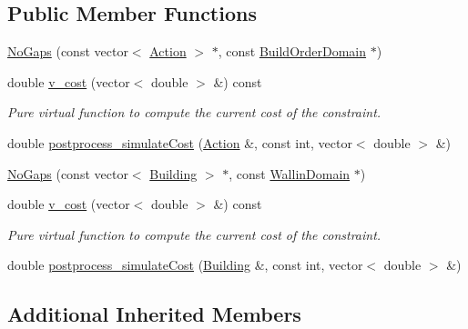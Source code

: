 \subsection*{Public Member Functions}
\begin{DoxyCompactItemize}
\item 
\hyperlink{classghost_1_1NoGaps_a7c3840344616681499ee350de3a33819}{No\-Gaps} (const vector$<$ \hyperlink{classghost_1_1Action}{Action} $>$ $\ast$, const \hyperlink{classghost_1_1BuildOrderDomain}{Build\-Order\-Domain} $\ast$)
\item 
double \hyperlink{classghost_1_1NoGaps_a3fa23de6946e443f009ecb5054a96572}{v\-\_\-cost} (vector$<$ double $>$ \&) const 
\begin{DoxyCompactList}\small\item\em Pure virtual function to compute the current cost of the constraint. \end{DoxyCompactList}\item 
double \hyperlink{classghost_1_1NoGaps_a7c2d73c135cf5c628b19b37f81fe0275}{postprocess\-\_\-simulate\-Cost} (\hyperlink{classghost_1_1Action}{Action} \&, const int, vector$<$ double $>$ \&)
\item 
\hyperlink{classghost_1_1NoGaps_a3f3cbd41ad60c54f6030dd5203a25610}{No\-Gaps} (const vector$<$ \hyperlink{classghost_1_1Building}{Building} $>$ $\ast$, const \hyperlink{classghost_1_1WallinDomain}{Wallin\-Domain} $\ast$)
\item 
double \hyperlink{classghost_1_1NoGaps_a3fa23de6946e443f009ecb5054a96572}{v\-\_\-cost} (vector$<$ double $>$ \&) const 
\begin{DoxyCompactList}\small\item\em Pure virtual function to compute the current cost of the constraint. \end{DoxyCompactList}\item 
double \hyperlink{classghost_1_1NoGaps_a65b1ce5aa567ad8c67b184cec8f320ac}{postprocess\-\_\-simulate\-Cost} (\hyperlink{classghost_1_1Building}{Building} \&, const int, vector$<$ double $>$ \&)
\end{DoxyCompactItemize}
\subsection*{Additional Inherited Members}


